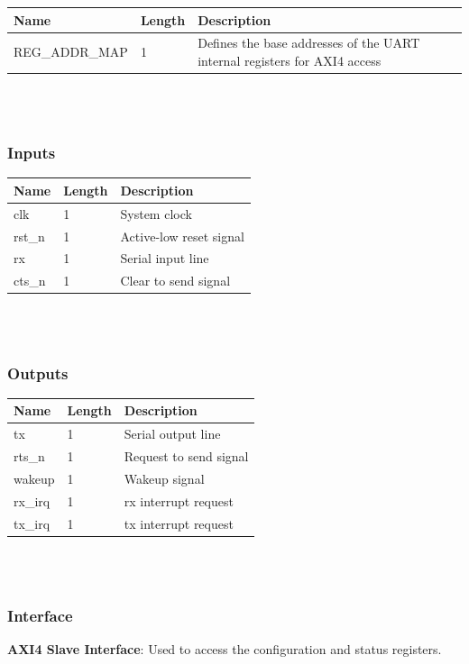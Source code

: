 \documentclass[12pt]{article}
\begin{document}
\noindent \begin{tabular}{|p{4cm}|p{2cm}|p{7cm}|}
  \hline
  \rowcolor{light-gray}\textbf{Name} & \textbf{Length} & \textbf{Description} \\
  \hline
  REG\_ADDR\_MAP & 1 & Defines the base addresses of the UART internal registers for AXI4 access \\
  \hline
\end{tabular} \\~\\

\subsubsection{Inputs}
\noindent \begin{tabular}{|p{2cm}|p{2cm}|p{9cm}|}
  \hline
  \rowcolor{light-gray}\textbf{Name} & \textbf{Length} & \textbf{Description} \\
  \hline
  clk & 1 & System clock \\
  \hline
  rst\_n & 1 & Active-low reset signal \\
  \hline
  rx & 1 & Serial input line \\
  \hline
  cts\_n & 1 & Clear to send signal \\
  \hline
\end{tabular} \\~\\

\subsubsection{Outputs}
\noindent \begin{tabular}{|p{2cm}|p{2cm}|p{9cm}|}
  \hline
  \rowcolor{light-gray}\textbf{Name} & \textbf{Length} & \textbf{Description} \\
  \hline
  tx & 1 & Serial output line \\
  \hline
  rts\_n & 1 & Request to send signal \\
  \hline
  wakeup & 1 & Wakeup signal \\
  \hline
  rx\_irq & 1 & rx interrupt request \\
  \hline
  tx\_irq & 1 & tx interrupt request \\
  \hline
\end{tabular} \\~\\

\subsubsection{Interface}
\textbf{AXI4 Slave Interface}: Used to access the configuration and status registers.
\newpage
\end{document}
